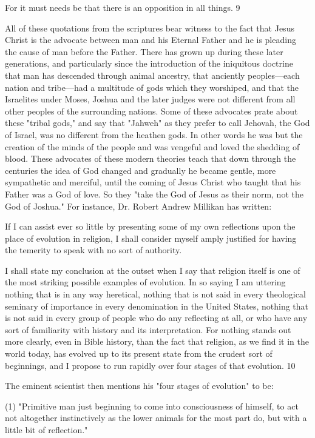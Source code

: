 For it must needs be that there is an opposition in all things. 9

All of these quotations from the scriptures bear witness to the fact that Jesus Christ is the
advocate between man and his Eternal Father and he is pleading the cause of man before the
Father. There has grown up during these later generations, and particularly since the
introduction of the iniquitous doctrine that man has descended through animal ancestry, that
anciently peoples—each nation and tribe—had a multitude of gods which they worshiped,
and that the Israelites under Moses, Joshua and the later judges were not different from all
other peoples of the surrounding nations. Some of these advocates prate about these "tribal
gods," and say that "Jahweh" as they prefer to call Jehovah, the God of Israel, was no
different from the heathen gods. In other words he was but the creation of the minds of the
people and was vengeful and loved the shedding of blood. These advocates of these modern
theories teach that down through the centuries the idea of God changed and gradually he
became gentle, more sympathetic and merciful, until the coming of Jesus Christ who taught
that his Father was a God of love. So they "take the God of Jesus as their norm, not the God
of Joshua." For instance, Dr. Robert Andrew Millikan has written:

If I can assist ever so little by presenting some of my own reflections upon the place of
evolution in religion, I shall consider myself amply justified for having the temerity to speak
with no sort of authority.

I shall state my conclusion at the outset when I say that religion itself is one of the most
striking possible examples of evolution. In so saying I am uttering nothing that is in any way
heretical, nothing that is not said in every theological seminary of importance in every
denomination in the United States, nothing that is not said in every group of people who do
any reflecting at all, or who have any sort of familiarity with history and its interpretation.
For nothing stands out more clearly, even in Bible history, than the fact that religion, as we
find it in the world today, has evolved up to its present state from the crudest sort of
beginnings, and I propose to run rapidly over four stages of that evolution. 10

The eminent scientist then mentions his "four stages of evolution" to be:

(1) "Primitive man just beginning to come into consciousness of himself, to act not altogether
instinctively as the lower animals for the most part do, but with a little bit of reflection."

